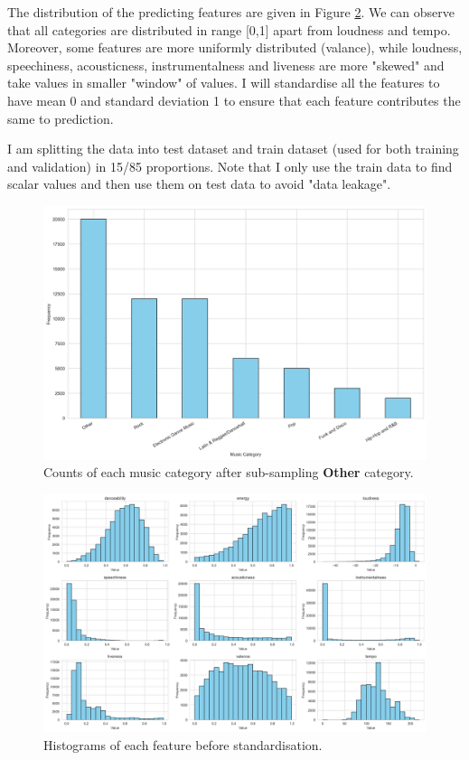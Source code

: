 \documentclass{assignment}
\begin{document}
\medskip

The distribution of the predicting features are given in Figure \ref{fig:histograms_of_features}. We can observe that all categories are distributed in range [0,1] apart from loudness and tempo. Moreover, some features are more uniformly distributed (valance), while loudness, speechiness, acousticness, instrumentalness and liveness are more "skewed" and take values in smaller "window" of values. I will standardise all the features to have mean 0 and standard deviation 1 to ensure that each feature contributes the same to prediction. 

\medskip

I am splitting the data into test dataset and train dataset (used for both training and validation) in 15/85 proportions. Note that I only use the train data to find scalar values and then use them on test data to avoid "data leakage".

\begin{figure}[H]
\centering
\includegraphics[width=0.9\linewidth]{music_categories_counts.png}
\caption{\label{fig:music_categories_counts}Counts of each music category after sub-sampling \textbf{Other} category.}
\end{figure}


\begin{figure}[H]
\centering
\includegraphics[width=0.9\linewidth]{histograms_of_features.png}
\caption{\label{fig:histograms_of_features}Histograms of each feature before standardisation.}
\end{figure}
\end{document}
